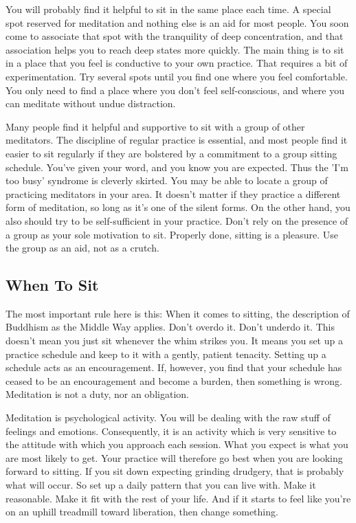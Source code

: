 You will probably find it helpful to sit in the same place each time. A special
spot reserved for meditation and nothing else is an aid for most people. You
soon come to associate that spot with the tranquility of deep concentration, and
that association helps you to reach deep states more quickly. The main thing is
to sit in a place that you feel is conductive to your own practice. That
requires a bit of experimentation. Try several spots until you find one where
you feel comfortable. You only need to find a place where you don't feel
self-conscious, and where you can meditate without undue distraction.

Many people find it helpful and supportive to sit with a group of other
meditators. The discipline of regular practice is essential, and most people
find it easier to sit regularly if they are bolstered by a commitment to a group
sitting schedule. You've given your word, and you know you are expected. Thus
the 'I'm too busy' syndrome is cleverly skirted. You may be able to locate a
group of practicing meditators in your area. It doesn't matter if they practice
a different form of meditation, so long as it's one of the silent forms. On the
other hand, you also should try to be self-sufficient in your practice. Don't
rely on the presence of a group as your sole motivation to sit. Properly done,
sitting is a pleasure. Use the group as an aid, not as a crutch.

\subsection*{When To Sit}
The most important rule here is this: When it comes to sitting, the
description of Buddhism as the Middle Way applies. Don't overdo it. Don't
underdo it. This doesn't mean you just sit whenever the whim strikes you. It
means you set up a practice schedule and keep to it with a gently, patient
tenacity. Setting up a schedule acts as an encouragement. If, however, you find
that your schedule has ceased to be an encouragement and become a burden, then
something is wrong. Meditation is not a duty, nor an obligation.

Meditation is psychological activity. You will be dealing with the raw stuff of
feelings and emotions. Consequently, it is an activity which is very sensitive
to the attitude with which you approach each session. What you expect is what
you are most likely to get. Your practice will therefore go best when you are
looking forward to sitting. If you sit down expecting grinding drudgery, that is
probably what will occur. So set up a daily pattern that you can live with. Make
it reasonable. Make it fit with the rest of your life. And if it starts to feel
like you're on an uphill treadmill toward liberation, then change something.

